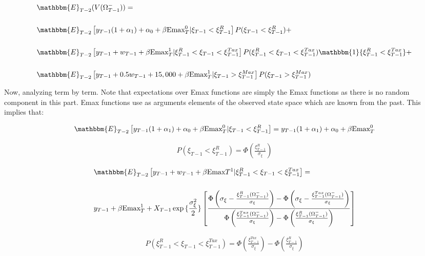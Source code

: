 \documentclass[11pt]{article}
\begin{document}
\begin{align}
	& \mathbbm{E}_{T-2}(V(\Omega_{T-1}^-))=\nonumber \\[0.2in]
	& \mathbbm{E}_{T-2}\left[y_{T-1}(1+\alpha_1)+\alpha_0+\beta\text{Emax}_T^0|\xi_{T-1}<\xi_{T-1}^R\right]P(\xi_{T-1}<\xi_{T-1}^R)+\nonumber \\[0.2in]
	& \mathbbm{E}_{T-2}\left[ y_{T-1}+w_{T-1}+\beta\text{Emax}_T^1|\xi_{T-1}^R<\xi_{T-1}<\xi_{T-1}^{Tax}\right]P(\xi_{T-1}^R<\xi_{T-1}<\xi_{T-1}^{Tax})\mathbbm{1}\{\xi_{T-1}^R<\xi_{T-1}^{Tax}\}+\nonumber \\[0.2in]
	& \mathbbm{E}_{T-2}\left[ y_{T-1}+0.5w_{T-1}+15,000+\beta\text{Emax}_{T}^1|\xi_{T-1}>\xi^{Max}_{T-1}\right]P(\xi_{T-1}>\xi^{Max}_{T-1})
\end{align}

Now, analyzing term by term. Note that expectations over Emax functions are simply the Emax functions as there is no random component in this part. Emax functions use as arguments elements of the observed state space which are known from the past. This implies that:


\begin{align}
	 \mathbbm{E}_{T-2}\left[y_{T-1}(1+\alpha_1)+\alpha_0+\beta\text{Emax}_T^0|\xi_{T-1}<\xi_{T-1}^R\right]=y_{T-1}(1+\alpha_1)+\alpha_0+\beta\text{Emax}_T^0
\end{align}

\begin{align}
	P(\xi_{T-1}<\xi_{T-1}^R)=\Phi\left(\frac{\xi_{T-1}^R}{\sigma_\xi}\right)
\end{align}

\begin{align}
 	& \mathbbm{E}_{T-2}\left[ y_{T-1}+w_{T-1}+\beta\text{Emax}T^1|\xi_{T-1}^R<\xi_{T-1}<\xi_{T-1}^{Tax}\right]=\nonumber \\[0.2in]
	& y_{T-1}+\beta\text{Emax}_T^1+X_{T-1}\exp{\{\frac{\sigma_\xi^2}{2}\}}\left[ \frac{\Phi\left(\sigma_{\xi}-\frac{\xi_{T-1}^R(\Omega_{T-1}^-)}{\sigma_\xi}\right)-\Phi\left(\sigma_{\xi}-\frac{\xi_{T-1}^{Tax}(\Omega_{T-1}^-)}{\sigma_\xi}\right)}{\Phi\left(\frac{\xi_{T-1}^{Tax}(\Omega_{T-1}^-)}{\sigma_\xi}\right)-\Phi\left(\frac{\xi_{T-1}^{R}(\Omega_{T-1}^-)}{\sigma_\xi}\right)}\right]
\end{align}

\begin{align}
	P(\xi_{T-1}^R<\xi_{T-1}<\xi_{T-1}^{Tax})=\Phi\left(\frac{\xi_{T-1}^{Tax}}{\sigma_\xi}\right)-\Phi\left(\frac{\xi_{T-1}^R}{\sigma_\xi}\right)
\end{align}
	
\end{document}
